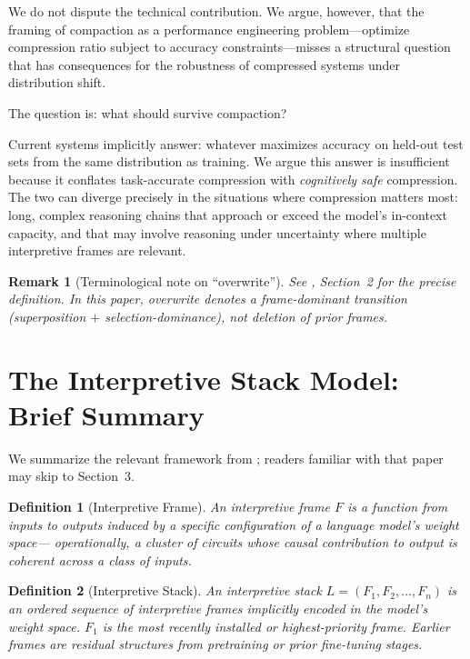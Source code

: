 \documentclass[12pt]{article}
\newtheorem{definition}{Definition}
\newtheorem{remark}{Remark}
\begin{document}
We do not dispute the technical contribution. We argue, however, that the
framing of compaction as a performance engineering problem---optimize
compression ratio subject to accuracy constraints---misses a structural
question that has consequences for the robustness of compressed systems
under distribution shift.

The question is: what should survive compaction?

Current systems implicitly answer: whatever maximizes accuracy on held-out
test sets from the same distribution as training. We argue this answer is
insufficient because it conflates task-accurate compression with
\emph{cognitively safe} compression. The two can diverge precisely in the
situations where compression matters most: long, complex reasoning chains
that approach or exceed the model's in-context capacity, and that may
involve reasoning under uncertainty where multiple interpretive frames are
relevant.


\begin{remark}[Terminological note on ``overwrite'']
See \cite{minamoto2026accumulation}, Section~2 for the precise definition.
In this paper, \emph{overwrite} denotes a frame-dominant transition
(superposition $+$ selection-dominance), not deletion of prior frames.
\end{remark}

\section{The Interpretive Stack Model: Brief Summary}

We summarize the relevant framework from \citet{minamoto2026accumulation};
readers familiar with that paper may skip to Section~3.

\begin{definition}[Interpretive Frame]
An interpretive frame $F$ is a function from inputs to outputs induced
by a specific configuration of a language model's weight space---
operationally, a cluster of circuits whose causal contribution to output
is coherent across a class of inputs.
\end{definition}

\begin{definition}[Interpretive Stack]
An interpretive stack $L = (F_1, F_2, \ldots, F_n)$ is an ordered
sequence of interpretive frames implicitly encoded in the model's weight
space. $F_1$ is the most recently installed or highest-priority frame.
Earlier frames are residual structures from pretraining or prior
fine-tuning stages.
\end{definition}
\end{document}

